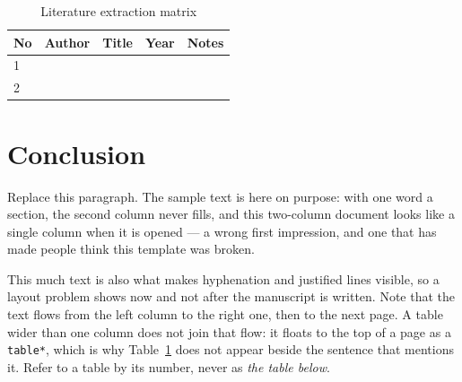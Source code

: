 \documentclass[10pt,a4paper,twocolumn]{article}
\begin{document}
%
\begin{table}[t]
  \centering
  \caption{Literature extraction matrix}
  \label{tab:lit}
  \small
  \begin{tabular}{@{}p{0.6cm}p{3cm}p{4cm}p{1cm}p{4.5cm}@{}}
    \toprule
    No & Author & Title & Year & Notes \\
    \midrule
    1 & & & & \\
    2 & & & & \\
    \bottomrule
  \end{tabular}
\end{table}

\section{Conclusion}
Replace this paragraph. The sample text is here on purpose: with one word a section, the second column never fills, and this two-column document looks like a single column when it is opened --- a wrong first impression, and one that has made people think this template was broken.

This much text is also what makes hyphenation and justified lines visible, so a layout problem shows now and not after the manuscript is written. Note that the text flows from the left column to the right one, then to the next page. A table wider than one column does not join that flow: it floats to the top of a page as a \texttt{table*}, which is why Table~\ref{tab:lit} does not appear beside the sentence that mentions it. Refer to a table by its number, never as \emph{the table below}.


% 
\end{document}
